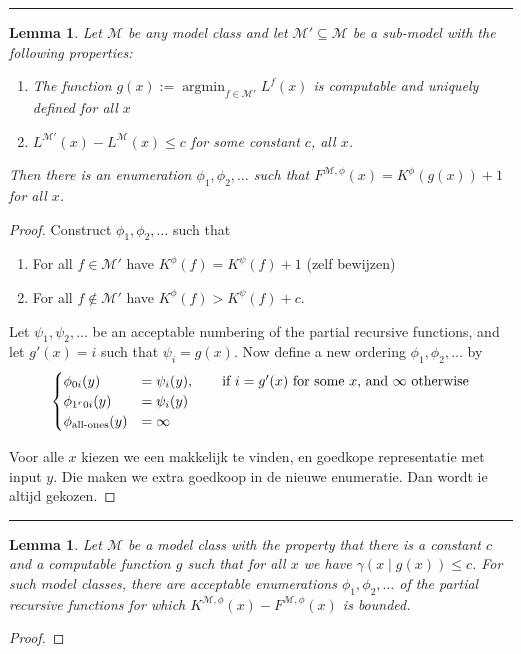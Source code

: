 \documentclass{article}
\newtheorem{lemma}[theorem]{Lemma}
\newcommand{\M}{\mathcal M}
\newcommand{\tn}[1]{\textnormal{#1}}
\newcommand{\argmin}{\mathop{\arg\min}}
\begin{document}
\hrule

\begin{lemma}
  Let $\M$ be any model class and let $\M'\subseteq \M$ be a sub-model with the following properties:
\begin{enumerate}
  \item The function $g(x):=\argmin_{f\in\M'}L^f(x)$ is computable and uniquely defined for all $x$
  \item $L^{\M'}(x)-L^{\M}(x)\le c$ for some constant $c$, all $x$.
\end{enumerate}
Then there is an enumeration $\phi_1,\phi_2,\ldots$ such that $F^{\M,\phi}(x)=K^\phi(g(x))+1$ for all $x$.
\end{lemma}
\begin{proof}

Construct $\phi_1,\phi_2,\ldots$ such that
\begin{enumerate}
\item For all $f\in\M'$ have $K^\phi(f) = K^\psi(f)+1$ (zelf bewijzen)
\item For all $f\not\in\M'$ have $K^\phi(f)>K^\psi(f)+c$.
\end{enumerate}






Let $\psi_1,\psi_2,\ldots$ be an acceptable numbering of the partial recursive functions, and let $g'(x)=i$ such that $\psi_i=g(x)$. Now define a new ordering $\phi_1,\phi_2,\ldots$ by
\[
\begin{cases}
\phi_{0i}(y)&=\psi_i(y),\qquad\tn{if $i=g'(x)$ for some $x$, and $\infty$ otherwise}\\
\phi_{1^r0i}(y)&=\psi_i(y)\\
\phi_{\tn{all-ones}}(y)&=\infty
\end{cases}
\]




Voor alle $x$ kiezen we een makkelijk te vinden, en goedkope representatie met input $y$. Die maken we extra goedkoop in de nieuwe enumeratie. Dan wordt ie altijd gekozen.
\end{proof}
\hrule
\begin{lemma}
  Let $\M$ be a model class with the property that there is a constant $c$ and a computable function $g$ such that for all $x$ we have $\gamma(x\mid g(x))\le c$.
  For such model classes, there are acceptable enumerations $\phi_1,\phi_2,\ldots$ of the partial recursive functions for which $K^{\M,\phi}(x)-F^{\M,\phi}(x)$ is bounded.
\end{lemma}
\begin{proof}
  
\end{proof}
\end{document}
